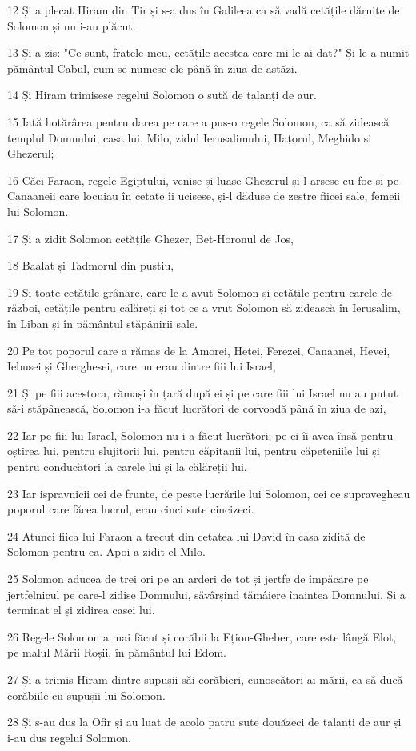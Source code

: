 \par 12 Și a plecat Hiram din Tir și s-a dus în Galileea ca să vadă cetățile dăruite de Solomon și nu i-au plăcut.
\par 13 Și a zis: "Ce sunt, fratele meu, cetățile acestea care mi le-ai dat?" Și le-a numit pământul Cabul, cum se numesc ele până în ziua de astăzi.
\par 14 Și Hiram trimisese regelui Solomon o sută de talanți de aur.
\par 15 Iată hotărârea pentru darea pe care a pus-o regele Solomon, ca să zidească templul Domnului, casa lui, Milo, zidul Ierusalimului, Hațorul, Meghido și Ghezerul;
\par 16 Căci Faraon, regele Egiptului, venise și luase Ghezerul și-l arsese cu foc și pe Canaaneii care locuiau în cetate îi ucisese, și-l dăduse de zestre fiicei sale, femeii lui Solomon.
\par 17 Și a zidit Solomon cetățile Ghezer, Bet-Horonul de Jos,
\par 18 Baalat și Tadmorul din pustiu,
\par 19 Și toate cetățile grânare, care le-a avut Solomon și cetățile pentru carele de război, cetățile pentru călăreți și tot ce a vrut Solomon să zidească în Ierusalim, în Liban și în pământul stăpânirii sale.
\par 20 Pe tot poporul care a rămas de la Amorei, Hetei, Ferezei, Canaanei, Hevei, Iebusei și Gherghesei, care nu erau dintre fiii lui Israel,
\par 21 Și pe fiii acestora, rămași în țară după ei și pe care fiii lui Israel nu au putut să-i stăpânească, Solomon i-a făcut lucrători de corvoadă până în ziua de azi,
\par 22 Iar pe fiii lui Israel, Solomon nu i-a făcut lucrători; pe ei îi avea însă pentru oștirea lui, pentru slujitorii lui, pentru căpitanii lui, pentru căpeteniile lui și pentru conducători la carele lui și la călăreții lui.
\par 23 Iar ispravnicii cei de frunte, de peste lucrările lui Solomon, cei ce supravegheau poporul care făcea lucrul, erau cinci sute cincizeci.
\par 24 Atunci fiica lui Faraon a trecut din cetatea lui David în casa zidită de Solomon pentru ea. Apoi a zidit el Milo.
\par 25 Solomon aducea de trei ori pe an arderi de tot și jertfe de împăcare pe jertfelnicul pe care-l zidise Domnului, săvârșind tămâiere înaintea Domnului. Și a terminat el și zidirea casei lui.
\par 26 Regele Solomon a mai făcut și corăbii la Ețion-Gheber, care este lângă Elot, pe malul Mării Roșii, în pământul lui Edom.
\par 27 Și a trimis Hiram dintre supușii săi corăbieri, cunoscători ai mării, ca să ducă corăbiile cu supușii lui Solomon.
\par 28 Și s-au dus la Ofir și au luat de acolo patru sute douăzeci de talanți de aur și i-au dus regelui Solomon.

